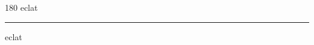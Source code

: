
\begin{frame}
\begin{center}
\begin{turn}{180}
{\fontsize{2.5cm}{1em}\selectfont eclat}
\end{turn}
\vspace{1em}\par  
\hrule
\vspace{1em}\par  
{\fontsize{2.5cm}{1em}\selectfont eclat}
\end{center}
\end{frame}
